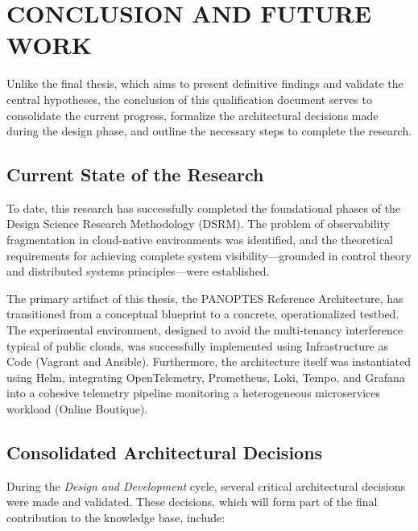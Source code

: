 \chapter{CONCLUSION AND FUTURE WORK}
\label{chap:conclusion}

Unlike the final thesis, which aims to present definitive findings and validate the central hypotheses, the conclusion of this qualification document serves to consolidate the current progress, formalize the architectural decisions made during the design phase, and outline the necessary steps to complete the research.

\section{Current State of the Research}

To date, this research has successfully completed the foundational phases of the Design Science Research Methodology (DSRM). The problem of observability fragmentation in cloud-native environments was identified, and the theoretical requirements for achieving complete system visibility—grounded in control theory and distributed systems principles—were established.

The primary artifact of this thesis, the PANOPTES Reference Architecture, has transitioned from a conceptual blueprint to a concrete, operationalized testbed. The experimental environment, designed to avoid the multi-tenancy interference typical of public clouds, was successfully implemented using Infrastructure as Code (Vagrant and Ansible). Furthermore, the architecture itself was instantiated using Helm, integrating OpenTelemetry, Prometheus, Loki, Tempo, and Grafana into a cohesive telemetry pipeline monitoring a heterogeneous microservices workload (Online Boutique).

\section{Consolidated Architectural Decisions}

During the \textit{Design and Development} cycle, several critical architectural decisions were made and validated. These decisions, which will form part of the final contribution to the knowledge base, include:

